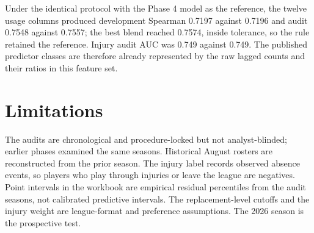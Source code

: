\documentclass[11pt]{article}
\begin{document}
Under the identical protocol with the Phase 4 model as the reference, the twelve usage columns produced development Spearman 0.7197 against 0.7196 and audit 0.7548 against 0.7557; the best blend reached 0.7574, inside tolerance, so the rule retained the reference. Injury audit AUC was 0.749 against 0.749. The published predictor classes are therefore already represented by the raw lagged counts and their ratios in this feature set.

\section{Limitations}

The audits are chronological and procedure-locked but not analyst-blinded; earlier phases examined the same seasons. Historical August rosters are reconstructed from the prior season. The injury label records observed absence events, so players who play through injuries or leave the league are negatives. Point intervals in the workbook are empirical residual percentiles from the audit seasons, not calibrated predictive intervals. The replacement-level cutoffs and the injury weight are league-format and preference assumptions. The 2026 season is the prospective test.



\end{document}
